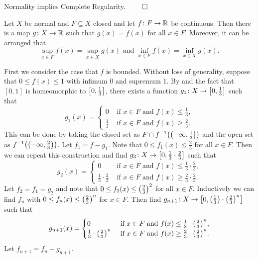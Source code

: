 \documentclass[letterpaper, 11pt, oneside]{book}
\begin{document}
\begin{cor}\label{cor: normal_implies_comp_reg}
  Normality implies Complete Regularity. $\qed$
\end{cor}

\begin{thrm}
  Let $X$ be normal and $F \subseteq X$ closed and let $f\colon F \to \mathbb{R}$ be continuous.
  Then there is a map $g\colon X \to \mathbb{R}$ such that $g(x) = f(x)$ for all $x \in F$.
  Moreover, it can be arranged that
  \[
    \sup_{x \in F} f(x) = \sup_{x \in X} g(x) \text{ and } \inf_{x \in F} f(x) = \inf_{x \in X} g(x).
  \]
\end{thrm}
\begin{pf}
  First we consider the case that $f$ is bounded.
  Without loss of generality, suppose that $0 \leq f(x) \leq 1$ with infimum $0$ and supremum $1$.
  By  and the fact that $[0, 1]$ is homeomorphic to $\bqty{0, \frac{1}{3}}$, there exists a function $g_{1}\colon X \to \bqty{0, \frac{1}{3}}$ such that
  \[
    g_{1}(x) = \begin{cases}
                 0           & \text{ if } x \in F \text{ and } f(x) \leq \frac{1}{3}, \\
                 \frac{1}{3} & \text{ if } x \in F \text{ and } f(x) \geq \frac{2}{3}.
               \end{cases}
  \]
  This can be done by taking the closed set as $F \cap f^{-1}\pqty{\left(-\infty, \frac{1}{3}\right]}$ and the open set as $f^{-1}\pqty{\pqty{-\infty, \frac{2}{3}}}$.
  Let $f_{1} = f - g_{1}$.
  Note that $0 \leq f_{1}(x) \leq \frac{2}{3}$ for all $x \in F$.
  Then we can repeat this construction and find $g_{3}\colon X \to \bqty{0, \frac{1}{3} \cdot \frac{2}{3}}$ such that
  \[
    g_{2}(x) = \begin{cases}
                 0           & \text{ if } x \in F \text{ and } f(x) \leq \frac{1}{3} \cdot \frac{2}{3}, \\
                 \frac{1}{3} \cdot \frac{2}{3} & \text{ if } x \in F \text{ and } f(x) \geq \frac{2}{3} \cdot \frac{2}{3}.
               \end{cases}
  \]
  Let $f_{2} = f_{1} = g_{2}$ and note that $0 \leq f_{2}(x) \leq \pqty{\frac{2}{3}}^{2}$ for all $x \in F$.
  Inductively we can find $f_{n}$ with $0 \leq f_{n}(x) \leq \pqty{\frac{2}{3}}^{n}$ for $x \in F$.
  Then find $g_{n + 1}\colon X \to \bqty{0, \pqty{\frac{1}{3}} \cdot \pqty{\frac{2}{3}}^{n}}$ such that
  \[
    g_{n + 1}(x) = \begin{cases}
                 0           & \text{ if } x \in F \text{ and } f(x) \leq \frac{1}{3} \cdot \pqty{\frac{2}{3}}^{n}, \\
                 \frac{1}{3} \cdot \pqty{\frac{2}{3}}^{n} & \text{ if } x \in F \text{ and } f(x) \geq \frac{2}{3} \cdot \pqty{\frac{2}{3}}^{n}.
               \end{cases}
  \]
  Let $f_{n + 1} = f_{n} - g_{n + 1}$.


\end{pf}
\end{document}
